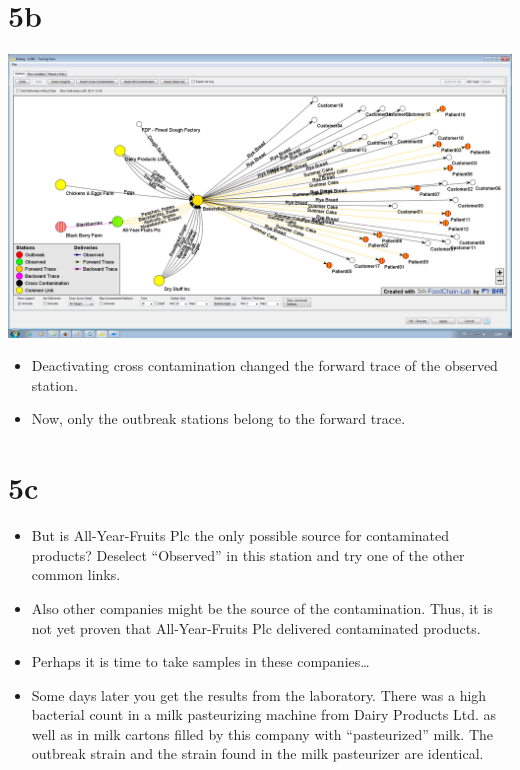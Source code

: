 \documentclass[10pt]{beamer}
\begin{document}
\section{5b}
\begin{frame}
	\begin{center}
  		\includegraphics[height=0.6\textheight]{5b.png}
	\end{center}
	\begin{itemize}
		\item Deactivating cross contamination changed the forward trace of the observed station.
		\item Now, only the outbreak stations belong to the forward trace.
	\end{itemize}
\end{frame}

\section{5c}
\begin{frame}
	\begin{itemize}
		\item But is All-Year-Fruits Plc the only possible source for contaminated products? Deselect “Observed” in this station and try one of the other common links.
		\item Also other companies might be the source of the contamination. Thus, it is not yet proven that All-Year-Fruits Plc delivered contaminated products.
		\item Perhaps it is time to take samples in these companies…
		\item Some days later you get the results from the laboratory. There was a high bacterial count in a milk pasteurizing machine from Dairy Products Ltd. as well as in milk cartons filled by this company with “pasteurized” milk. The outbreak strain and the strain found in the milk pasteurizer are identical.
	\end{itemize}
\end{frame}
\end{document}
